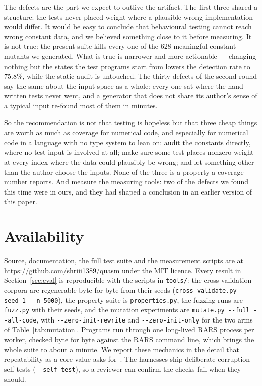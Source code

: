 \documentclass[11pt]{article}
\begin{document}
The defects are the part we expect to outlive the artifact. The first three shared a
structure: the tests never placed weight where a plausible wrong implementation would
differ. It would be easy to conclude that behavioural testing cannot reach wrong constant
data, and we believed something close to it before measuring. It is not true: the present
suite kills every one of the 628 meaningful constant mutants we generated. What
is true is narrower and more actionable --- changing nothing but the states the test
programs start from lowers the detection rate to 75.8\%, while the static audit
is untouched. The thirty defects of the second round say the same about the input space
as a whole: every one sat where the hand-written tests never went, and a generator that
does not share its author's sense of a typical input re-found most of them in minutes.

So the recommendation is not that testing is hopeless but that three cheap things are worth
as much as coverage for numerical code, and especially for numerical code in a language
with no type system to lean on: audit the constants directly, where no test input is
involved at all; make sure some test places nonzero weight at every index where the data
could plausibly be wrong; and let something other than the author choose the inputs. None
of the three is a property a coverage number reports. And measure the measuring tools: two
of the defects we found this time were in ours, and they had shaped a conclusion in an
earlier version of this paper.

\section*{Availability}

Source, documentation, the full test suite and the measurement scripts are at
\url{https://github.com/shriii1389/quasm} under the MIT licence. Every result in Section~\ref{sec:eval} is reproducible with the
scripts in \texttt{tools/}: the cross-validation corpora are regenerable byte for byte from
their seeds (\texttt{cross\_validate.py -{}-seed 1 -{}-n 5000}), the property suite is
\texttt{properties.py}, the fuzzing runs are \texttt{fuzz.py} with their seeds, and the
mutation experiments are \texttt{mutate.py -{}-full -{}-all-code}, with
\texttt{-{}-zero-init-rewrite} and \texttt{-{}-zero-init-only} for the two arms of
Table~\ref{tab:mutation}. Programs run through one long-lived RARS process per worker,
checked byte for byte against the RARS command line, which brings the whole suite to
about a minute. We report these mechanics in the detail that repeatability as a core value
asks for~\cite{krishnamurthi2015}. The harnesses ship deliberate-corruption self-tests
(\texttt{-{}-self-test}), so a reviewer can confirm the checks fail when they should.



\end{document}
